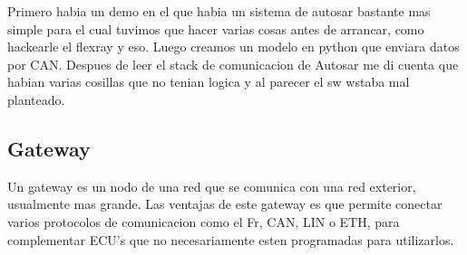 
Primero habia un demo en el que habia un sistema de autosar bastante mas simple para el cual tuvimos que hacer varias cosas antes de arrancar, como hackearle el flexray y eso. Luego creamos un modelo en python que enviara datos por CAN. Despues de leer el stack de comunicacion de Autosar me di cuenta que habian varias cosillas que no tenian logica y al parecer el sw wstaba mal planteado. 

\subsection{Gateway}

Un gateway es un nodo de una red que se comunica con una red exterior, usualmente mas grande. Las ventajas de este gateway es que permite conectar varios protocolos de comunicacion como el Fr, CAN, LIN o ETH, para complementar ECU's que no necesariamente esten programadas para utilizarlos. 

